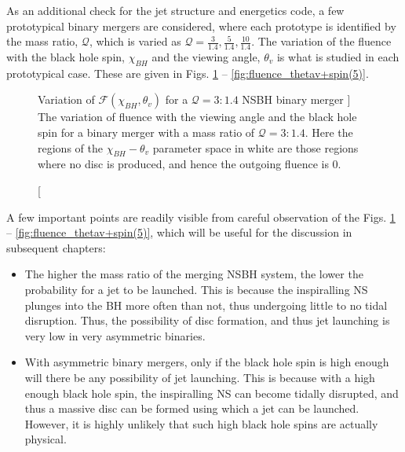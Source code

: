     As an additional check for the jet structure and energetics code, a few prototypical
    binary mergers are considered, where each prototype is identified by the mass ratio,
    $\mathcal{Q}$, which is varied as $\mathcal{Q} = \frac{3}{1.4}, \frac{5}{1.4},
    \frac{10}{1.4}$. The variation of the fluence with the black hole spin, $\chi_{BH}$
    and the viewing angle, $\theta_v$ is what is studied in each prototypical case.
    These are given in Figs. \ref{fig:fluence_thetav+spin(3)} --
    \ref{fig:fluence_thetav+spin(5)}.

    \begin{figure}[H]
        \centering
        \def\svgwidth{0.8\linewidth}
        
        \caption
        [
            Variation of $\mathcal{F}(\chi_{BH}, \theta_{v})$ for a $\mathcal{Q}=3:1.4$
            NSBH binary merger
        ]
        {
            The variation of fluence with the viewing angle and the black hole spin for
            a binary merger with a mass ratio of $\mathcal{Q}=3:1.4$. Here the regions
            of the $\chi_{BH}-\theta_v$ parameter space in white are those regions where
            no disc is produced, and hence the outgoing fluence is 0.
        }
        \label{fig:fluence_thetav+spin(3)}
    \end{figure}

    A few important points are readily visible from careful observation of the Figs.
    \ref{fig:fluence_thetav+spin(3)} -- \ref{fig:fluence_thetav+spin(5)}, which will be
    useful for the discussion in subsequent chapters:

    \begin{itemize}

        \item The higher the mass ratio of the merging NSBH system, the lower the
            probability for a jet to be launched. This is because the inspiralling NS
            plunges into the BH more often than not, thus undergoing little to no tidal
            disruption. Thus, the possibility of disc formation, and thus jet launching
            is very low in very asymmetric binaries.

        \item With asymmetric binary mergers, only if the black hole spin is high enough
            will there be any possibility of jet launching. This is because with a high
            enough black hole spin, the inspiralling NS can become tidally disrupted,
            and thus a massive disc can be formed using which a jet can be launched.
            However, it is highly unlikely that such high black hole spins are actually
            physical.

    \end{itemize}

